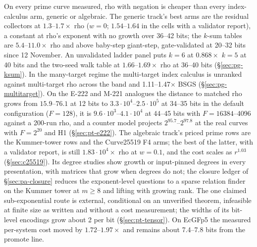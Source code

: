 On every prime curve measured, rho with negation is cheaper than every
index-calculus arm, generic or algebraic. The generic track's best arms are
the residual collectors at $1.3$--$1.7\times$ rho ($w=0$; $1.54$--$1.64$ in
the cells with a validator report), a constant at rho's exponent with no
growth over 36--42 bits; the $k$-sum tables are
$5.4$--$11.0\times$ rho and above baby-step giant-step, gate-validated at
20--32 bits since 12 November. An unvalidated ladder panel puts $k=6$ at
$0.868\times$ $k=5$ at 40 bits and the two-seed walk table at
$1.66$--$1.69\times$ rho at 36--40 bits (\S\ref{sec:pg-ksum}). In the many-target regime the multi-target
index calculus is unranked against multi-target rho across the band and
1.11--1.47$\times$ BSGS (\S\ref{sec:pg-multitarget}). On the E-222 and
M-221 analogues the distance to matched rho grows from $15.9$--$76.1$ at
12 bits to $3.3\cdot10^4$--$2.5\cdot10^5$ at 34--35 bits in the default
configuration ($F=128$), it is $9.6\cdot10^3$--$4.1\cdot10^4$ at 44--45 bits
with $F=16384$--4096 against a 200-run rho, and a counter model projects $2^{95.7}$--$2^{97.8}$ at the
real curves with $F=2^{20}$ and H1 (\S\ref{sec:pt-e222}). The algebraic track's
priced prime rows are the Kummer-tower rows and the Curve25519 F4 arms; the
best of the latter, with a validator report, is still $1.83\cdot10^4\times$
rho at $w=0.1$, and the cost scales as $r^{1.03}$ (\S\ref{sec:c25519}). Its degree
studies show growth or input-pinned degrees in every presentation, with
matrices that grow when degrees do not; the closure ledger of
\S\ref{sec:pa-closure} reduces the exponent-level questions to a sparse
relation finder on the Kummer tower at $m\ge8$ and lifting with growing
rank. The one claimed sub-exponential
route is external, conditional on an unverified theorem, infeasible at
finite size as written and without a cost measurement; the widths of its
bit-level encodings grow about 2 per bit (\S\ref{sec:pt-tensor}). On EcGFp5 the measured per-system
cost moved by $1.72$--$1.97\times$ and remains about 7.4--7.8 bits from the
promote line.

